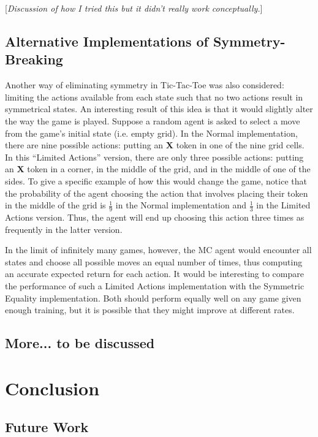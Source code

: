 \documentclass[11pt,a4paper]{report}
\begin{document}
[\emph{Discussion of how I tried this but it didn't really work conceptually.}]

\section{Alternative Implementations of Symmetry-Breaking}

Another way of eliminating symmetry in Tic-Tac-Toe was also considered: limiting the actions available from each state such that no two actions result in symmetrical states. An interesting result of this idea is that it would slightly alter the way the game is played. Suppose a random agent is asked to select a move from the game's initial state (i.e. empty grid). In the Normal implementation, there are nine possible actions: putting an \textbf{X} token in one of the nine grid cells. In this ``Limited Actions'' version, there are only three possible actions: putting an \textbf{X} token in a corner, in the middle of the grid, and in the middle of one of the sides. To give a specific example of how this would change the game, notice that the probability of the agent choosing the action that involves placing their token in the middle of the grid is $\frac{1}{9}$ in the Normal implementation and $\frac{1}{3}$ in the Limited Actions version. Thus, the agent will end up choosing this action three times as frequently in the latter version.

In the limit of infinitely many games, however, the MC agent would encounter all states and choose all possible moves an equal number of times, thus computing an accurate expected return for each action. It would be interesting to compare the performance of such a Limited Actions implementation with the Symmetric Equality implementation. Both should perform equally well on any game given enough training, but it is possible that they might improve at different rates.


\section{More... to be discussed}


\chapter{Conclusion}


\section{Future Work}
\end{document}
